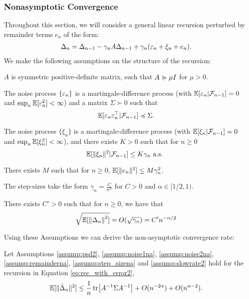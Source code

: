 \subsubsection{Nonasymptotic Convergence}
Throughout this section, we will consider a general linear recursion perturbed by remainder terms $e_n$ of the form:
\begin{align}
  \Delta_{n}=\Delta_{n-1} -\gamma_n A \Delta_{n-1}+ \gamma_n (\varepsilon_n+\xi_{n}+e_{n}). \label{eq:rec_with_error2}
\end{align}
We make the following assumptions on the structure of the recursion:
\begin{assumption} \label{assump:psd2}
  $A$ is symmetric positive-definite matrix, such that $A\succcurlyeq \mu I$ for $\mu > 0$.
\end{assumption}
\begin{assumption} \label{assump:noise1na}
    The noise process $\{ \varepsilon_{n} \}$ is a martingale-difference process (with  $\mathbb{E}[\varepsilon_n\vert\mathcal F_{n-1}]=0$  and  $\sup_n \mathbb{E}[\varepsilon_n^2] < \infty$) and a matrix $\Sigma \succ 0$ such that
    \[\mathbb{E}[\varepsilon_n\varepsilon_n^\top\vert\mathcal F_{n-1}] \preccurlyeq \Sigma.\]
\end{assumption}
\begin{assumption} \label{assump:noise2na}
    The noise process $\{ \xi_{n} \}$ is a martingale-difference process (with  $\mathbb{E}[\xi_n\vert\mathcal F_{n-1}]=0$ and $\sup_n \mathbb{E}[\xi_n^2] < \infty$), and there exists $K > 0$ such that for $n\geq 0$
    \[ \mathbb{E}[\Vert \xi_n\Vert^2\vert\mathcal F_{n-1}] \leq K\gamma_n \text{ a.s. } \]
\end{assumption}
\begin{assumption} \label{assump:remainderna}
There exists $M$ such that for $n \geq 0$, $\mathbb{E}[\Vert e_n \Vert^2] \leq M \gamma_n^2$.
\end{assumption}
\begin{assumption} \label{assump:step_sizena}
  The step-sizes take the form $\gamma_n=\frac{C}{n^\alpha}$
  for $C>0$ and $\alpha\in[1/2,1)$.
\end{assumption}
\begin{assumption} \label{assump:slowrate2}
  There exists $C' > 0$ such that for $n \geq 0$, we have that
  \[\sqrt{\mathbb{E}[\norm{\Delta_n}^2]} = O(\sqrt{\gamma_n}) = C' n^{-\alpha/2} \]
\end{assumption}
Using these Assumptions we can derive the non-asymptotic convergence rate:
\begin{theorem} \label{thm:nonasymp_ave}
 Let Assumptions \ref{assump:psd2}, \ref{assump:noise1na}, \ref{assump:noise2na}, \ref{assump:remainderna}, \ref{assump:step_sizena} and \ref{assump:slowrate2} hold for the recursion in Equation \ref{eq:rec_with_error2},
  \[
      \mathbb{E}[\Vert \bar{\Delta}_n \Vert ^2] \leq \frac{1}{n} \tr [A^{-1} \Sigma A^{-1}] +  O(n^{-2\alpha}) + O(n^{\alpha-2}).
      \]
\end{theorem}
